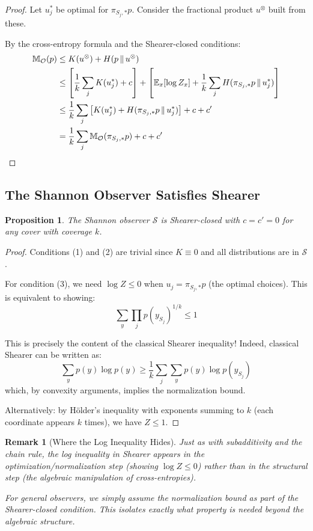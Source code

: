 \documentclass[11pt]{article}
\newtheorem{proposition}{Proposition}
\newtheorem{remark}{Remark}
\begin{document}
\begin{proof}
Let $u^*_j$ be optimal for $\pi_{S_j,*} p$. Consider the fractional product $u^{\otimes}$ built from these.

By the cross-entropy formula and the Shearer-closed conditions:
\begin{align}
\mathbb{M}_\mathcal{O}(p) &\leq K(u^{\otimes}) + H(p \,\|\, u^{\otimes}) \\
&\leq \left[\frac{1}{k} \sum_j K(u^*_j) + c\right] + \left[\mathbb{E}_x[\log Z_x] + \frac{1}{k} \sum_j H(\pi_{S_j,*} p \,\|\, u^*_j)\right] \\
&\leq \frac{1}{k} \sum_j \left[K(u^*_j) + H(\pi_{S_j,*} p \,\|\, u^*_j)\right] + c + c' \\
&= \frac{1}{k} \sum_j \mathbb{M}_\mathcal{O}(\pi_{S_j,*} p) + c + c' \qedhere
\end{align}
\end{proof}

\subsection*{The Shannon Observer Satisfies Shearer}

\begin{proposition}
The Shannon observer $\mathcal{S}$ is Shearer-closed with $c = c' = 0$ for any cover with coverage $k$.
\end{proposition}

\begin{proof}
Conditions (1) and (2) are trivial since $K \equiv 0$ and all distributions are in $\mathcal{S}$.

For condition (3), we need $\log Z \leq 0$ when $u_j = \pi_{S_j,*} p$ (the optimal choices).
This is equivalent to showing:
\[ \sum_y \prod_j p(y_{S_j})^{1/k} \leq 1 \]

This is precisely the content of the classical Shearer inequality! Indeed, classical Shearer can be written as:
\[ \sum_y p(y) \log p(y) \geq \frac{1}{k} \sum_j \sum_y p(y) \log p(y_{S_j}) \]
which, by convexity arguments, implies the normalization bound.

Alternatively: by H\"older's inequality with exponents summing to $k$ (each coordinate appears $k$ times), we have $Z \leq 1$.
\end{proof}

\begin{remark}[Where the Log Inequality Hides]
Just as with subadditivity and the chain rule, the log inequality in Shearer appears in the \emph{optimization/normalization step} (showing $\log Z \leq 0$) rather than in the \emph{structural step} (the algebraic manipulation of cross-entropies).

For general observers, we simply \emph{assume} the normalization bound as part of the Shearer-closed condition. This isolates exactly what property is needed beyond the algebraic structure.
\end{remark}
\end{document}
